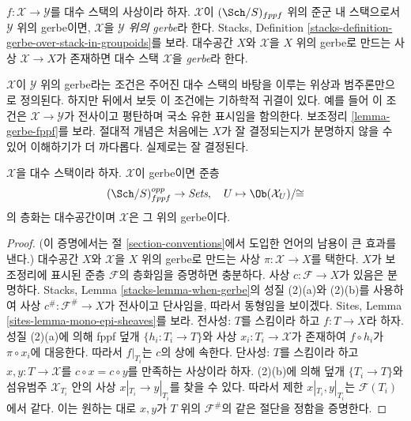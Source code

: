 \begin{definition}
\label{definition-gerbe}
$f : \mathcal{X} \to \mathcal{Y}$를 대수 스택의 사상이라 하자.
$\mathcal{X}$이 $(\Sch/S)_{fppf}$ 위의 준군 내 스택으로서
$\mathcal{Y}$ 위의 gerbe이면, $\mathcal{X}$을
$\mathcal{Y}$ {\it 위의 gerbe}라 한다. Stacks, Definition
\ref{stacks-definition-gerbe-over-stack-in-groupoids}를 보라.
대수공간 $X$와 $\mathcal{X}$을 $X$ 위의 gerbe로 만드는 사상
$\mathcal{X} \to X$가 존재하면 대수 스택 $\mathcal{X}$을
{\it gerbe}라 한다.
\end{definition}

\noindent
$\mathcal{X}$이 $\mathcal{Y}$ 위의 gerbe라는 조건은 주어진 대수 스택의
바탕을 이루는 위상과 범주론만으로 정의된다. 하지만 뒤에서 보듯 이
조건에는 기하학적 귀결이 있다. 예를 들어 이 조건은
$\mathcal{X} \to \mathcal{Y}$가 전사이고 평탄하며 국소 유한 표시임을
함의한다. 보조정리 \ref{lemma-gerbe-fppf}를 보라. 절대적 개념은 처음에는
$X$가 잘 결정되는지가 분명하지 않을 수 있어 이해하기가 더 까다롭다.
실제로는 잘 결정된다.

\begin{lemma}
\label{lemma-gerbe-over-iso-classes}
$\mathcal{X}$을 대수 스택이라 하자. $\mathcal{X}$이 gerbe이면 준층
$$
(\Sch/S)_{fppf}^{opp} \to \textit{Sets}, \quad
U \mapsto \Ob(\mathcal{X}_U)/\!\!\cong
$$
의 층화는 대수공간이며 $\mathcal{X}$은 그 위의 gerbe이다.
\end{lemma}

\begin{proof}
(이 증명에서는 절 \ref{section-conventions}에서 도입한 언어의 남용이
큰 효과를 낸다.) 대수공간 $X$와 $\mathcal{X}$을 $X$ 위의 gerbe로 만드는
사상 $\pi : \mathcal{X} \to X$를 택한다. $X$가 보조정리에 표시된 준층
$\mathcal{F}$의 층화임을 증명하면 충분하다. 사상
$c : \mathcal{F} \to X$가 있음은 분명하다. Stacks, Lemma
\ref{stacks-lemma-when-gerbe}의 성질 (2)(a)와 (2)(b)를 사용하여 사상
$c^\# : \mathcal{F}^\# \to X$가 전사이고 단사임을, 따라서 동형임을
보이겠다. Sites, Lemma \ref{sites-lemma-mono-epi-sheaves}를 보라.
전사성: $T$를 스킴이라 하고 $f : T \to X$라 하자. 성질 (2)(a)에 의해
fppf 덮개 $\{h_i : T_i \to T\}$와 사상
$x_i : T_i \to \mathcal{X}$가 존재하여 $f \circ h_i$가
$\pi \circ x_i$에 대응한다. 따라서 $f|_{T_i}$는 $c$의 상에 속한다.
단사성: $T$를 스킴이라 하고 $x, y : T \to \mathcal{X}$를
$c \circ x = c \circ y$를 만족하는 사상이라 하자. (2)(b)에 의해 덮개
$\{T_i \to T\}$와 섬유범주 $\mathcal{X}_{T_i}$ 안의 사상
$x|_{T_i} \to y|_{T_i}$를 찾을 수 있다. 따라서 제한
$x|_{T_i}, y|_{T_i}$는 $\mathcal{F}(T_i)$에서 같다. 이는 원하는 대로
$x, y$가 $T$ 위의 $\mathcal{F}^\#$의 같은 절단을 정함을 증명한다.
\end{proof}

